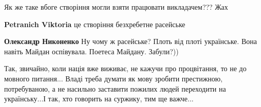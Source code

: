 \begin{itemize}
Як же таке вбоге створіння могли взяти працювати викладачем??? Жах

\begin{itemize}

\textbf{Petranich Viktoria} це створіння безхребетне расейське


\textbf{Олександр Никоненко} Ну чому ж расейське? Плоть від плоті українське.
Вона навіть Майдан оспівувала. Поетеса Майдану. Забули?))
\end{itemize}



Так, звичайно, коли нація вже виживає, не кажучи про процвітання, то не до
мовного питання... Владі треба думати як мову зробити престижною, потребуваною,
а не насильно заставити пожилих людей переходити на українську...І так, хто
говорить на суржику, тим ще важче...

\end{itemize}

